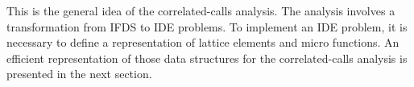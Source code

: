 This is the general idea of the correlated-calls analysis. The analysis involves a transformation from IFDS to IDE problems. To implement an IDE problem, it is necessary to define a representation of lattice elements and micro functions. An efficient representation of those data structures for the correlated-calls analysis is presented in the next section.
